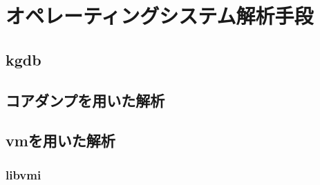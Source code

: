 \section{オペレーティングシステム解析手段}

\subsection{kgdb}

\subsection{コアダンプを用いた解析}

\subsection{vmを用いた解析}

\subsubsection{libvmi}
